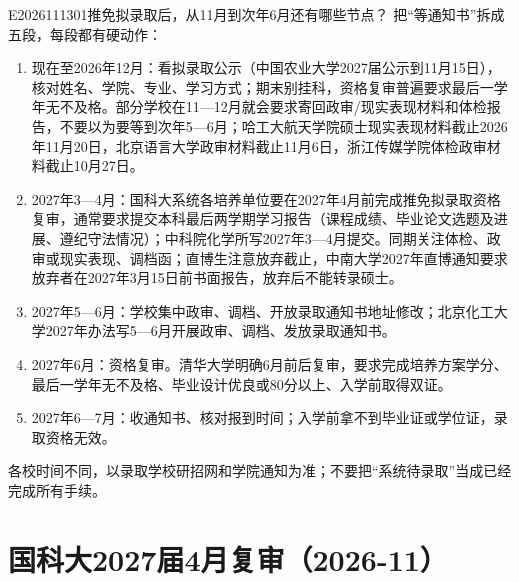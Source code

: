 \begin{qa}{E2026111301}{推免拟录取后，从11月到次年6月还有哪些节点？}
把“等通知书”拆成五段，每段都有硬动作：
\begin{enumerate}
  \item 现在至2026年12月：看拟录取公示（中国农业大学2027届公示到11月15日），核对姓名、学院、专业、学习方式；期末别挂科，资格复审普遍要求最后一学年无不及格。部分学校在11—12月就会要求寄回政审/现实表现材料和体检报告，不要以为要等到次年5—6月；哈工大航天学院硕士现实表现材料截止2026年11月20日，北京语言大学政审材料截止11月6日，浙江传媒学院体检政审材料截止10月27日。
  \item 2027年3—4月：国科大系统各培养单位要在2027年4月前完成推免拟录取资格复审，通常要求提交本科最后两学期学习报告（课程成绩、毕业论文选题及进展、遵纪守法情况）；中科院化学所写2027年3—4月提交。同期关注体检、政审或现实表现、调档函；直博生注意放弃截止，中南大学2027年直博通知要求放弃者在2027年3月15日前书面报告，放弃后不能转录硕士。
  \item 2027年5—6月：学校集中政审、调档、开放录取通知书地址修改；北京化工大学2027年办法写5—6月开展政审、调档、发放录取通知书。
  \item 2027年6月：资格复审。清华大学明确6月前后复审，要求完成培养方案学分、最后一学年无不及格、毕业设计优良或80分以上、入学前取得双证。
  \item 2027年6—7月：收通知书、核对报到时间；入学前拿不到毕业证或学位证，录取资格无效。
\end{enumerate}

各校时间不同，以录取学校研招网和学院通知为准；不要把“系统待录取”当成已经完成所有手续。
\end{qa}
\section{国科大2027届4月复审（2026-11）}

